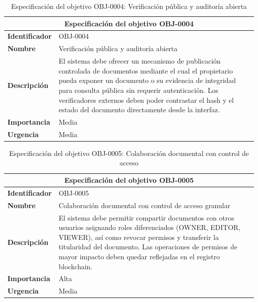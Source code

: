 \documentclass[11pt, a4paper]{article}
\begin{document}
\begin{table}[H]
    \centering
    \small
    \begin{tabular}{|p{4cm}|p{9cm}|}
    \hline
    \multicolumn{2}{|c|}{\textbf{Especificación del objetivo OBJ-0004}} \\
    \hline
    \textbf{Identificador} & OBJ-0004 \\
    \hline
    \textbf{Nombre} & Verificación pública y auditoría abierta \\
    \hline
    \textbf{Descripción} & El sistema debe ofrecer un mecanismo de publicación controlada de documentos mediante el cual el propietario pueda exponer un documento o su evidencia de integridad para consulta pública sin requerir autenticación. Los verificadores externos deben poder contrastar el hash y el estado del documento directamente desde la interfaz. \\
    \hline
    \textbf{Importancia} & Media \\
    \hline
    \textbf{Urgencia} & Media \\
    \hline
    \end{tabular}
    \caption{Especificación del objetivo OBJ-0004: Verificación pública y auditoría abierta}
    \label{tab:obj-0004}
\end{table}

\begin{table}[H]
    \centering
    \small
    \begin{tabular}{|p{4cm}|p{9cm}|}
    \hline
    \multicolumn{2}{|c|}{\textbf{Especificación del objetivo OBJ-0005}} \\
    \hline
    \textbf{Identificador} & OBJ-0005 \\
    \hline
    \textbf{Nombre} & Colaboración documental con control de acceso granular \\
    \hline
    \textbf{Descripción} & El sistema debe permitir compartir documentos con otros usuarios asignando roles diferenciados (OWNER, EDITOR, VIEWER), así como revocar permisos y transferir la titularidad del documento. Las operaciones de permisos de mayor impacto deben quedar reflejadas en el registro blockchain. \\
    \hline
    \textbf{Importancia} & Alta \\
    \hline
    \textbf{Urgencia} & Media \\
    \hline
    \end{tabular}
    \caption{Especificación del objetivo OBJ-0005: Colaboración documental con control de acceso}
    \label{tab:obj-0005}
\end{table}
\end{document}
